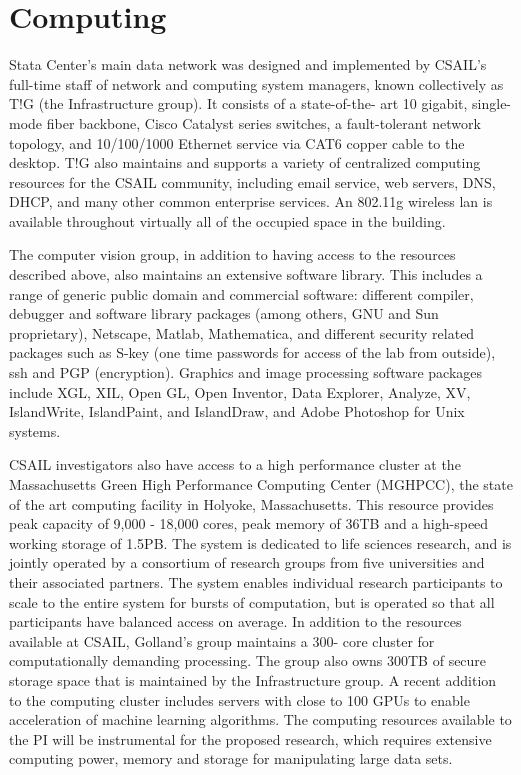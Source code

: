 \documentclass[11pt]{amsart}
\begin{document}
\hypertarget{x-computing}{\section*{Computing}}
Stata Center’s main data network was designed and implemented by CSAIL’s full-time staff of network and computing system managers, known collectively as T!G (the Infrastructure group). It consists of a state-of-the- art 10 gigabit, single-mode fiber backbone, Cisco Catalyst series switches, a fault-tolerant network topology, and 10/100/1000 Ethernet service via CAT6 copper cable to the desktop. T!G also maintains and supports a variety of centralized computing resources for the CSAIL community, including email service, web servers, DNS, DHCP, and many other common enterprise services. An 802.11g wireless lan is available throughout virtually all of the occupied
space in the building.


The computer vision group, in addition to having access to the resources described above, also maintains an extensive software library. This includes a range of generic public domain and commercial software: different compiler, debugger and software library packages (among others, GNU and Sun proprietary), Netscape, Matlab, Mathematica, and different security related packages such as S-key (one time passwords for access of the lab from outside), ssh and PGP (encryption). Graphics and image processing software packages include XGL, XIL, Open GL, Open Inventor, Data Explorer, Analyze, XV, IslandWrite, IslandPaint, and IslandDraw, and Adobe Photoshop for Unix systems.


CSAIL investigators also have access to a high performance cluster at the Massachusetts Green High Performance Computing Center (MGHPCC), the state of the art computing facility in Holyoke, Massachusetts. This resource provides peak capacity of 9,000 - 18,000 cores, peak memory of 36TB and a high-speed working storage of 1.5PB. The system is dedicated to life sciences research, and is jointly operated by a consortium of research groups from five universities and their associated partners. The system enables individual research participants to scale to the entire system for bursts of computation, but is operated so that all participants have balanced access on average. In addition to the resources available at CSAIL, Golland’s group maintains a 300- core cluster for computationally demanding processing. The group also owns 300TB of secure storage space that is maintained by the Infrastructure group. A recent addition to the computing cluster includes servers with close to 100 GPUs to enable acceleration of machine learning algorithms. The computing resources available to the PI will be instrumental for the proposed research, which requires extensive computing power, memory and storage for manipulating large data sets.
\end{document}
